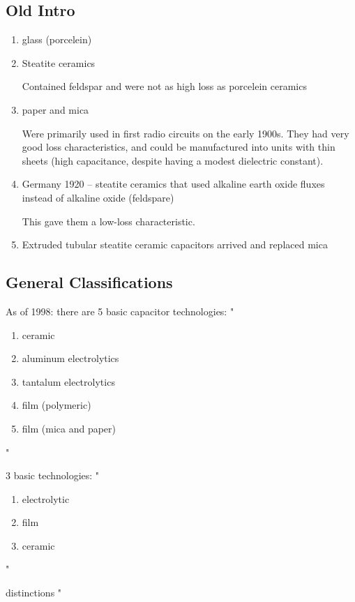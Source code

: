 \subsection{Old Intro}
    \begin{enumerate}
        \item glass (porcelein)
        \item Steatite ceramics

        Contained feldspar and were not as high loss as porcelein ceramics
        \item paper and mica 
        
        Were primarily used in first radio circuits on the early 1900s.
        They had very good loss characteristics, and could be manufactured into units with thin sheets (high capacitance, despite having a modest dielectric constant).
        \item Germany 1920 -- steatite ceramics that used alkaline earth oxide fluxes instead of alkaline oxide (feldspare)

        This gave them a low-loss characteristic.
        \item Extruded tubular steatite ceramic capacitors arrived and replaced mica
    \end{enumerate}
    \cite[Ch 3 Sec II]{cerMaterials}



\subsection{General Classifications}
As of 1998: there are 5 basic capacitor technologies:
"
\begin{enumerate}
    \item ceramic
    \item aluminum electrolytics
    \item tantalum electrolytics
    \item film (polymeric)
    \item film (mica and paper)
\end{enumerate}
"
\cite{capRev}

3 basic technologies:
"
\begin{enumerate}
    \item electrolytic
    \item film
    \item ceramic
\end{enumerate}
"
\cite{capRev}

distinctions
"

